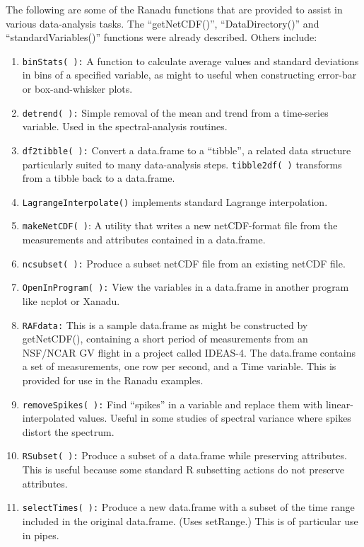 \documentclass[12pt,english]{report}\usepackage[]{graphicx}\usepackage[]{color}
\begin{document}
The following are some of the Ranadu functions that are provided to
assist in various data-analysis tasks. The ``getNetCDF()'', ``DataDirectory()''
and ``standardVariables()'' functions were already described. Others
include:
\begin{enumerate}
\item \texttt{binStats( ):} A function to calculate average values and standard
deviations in bins of a specified variable, as might to useful when
constructing error-bar or box-and-whisker plots.
\item \texttt{detrend( ):} Simple removal of the mean and trend from a time-series
variable. Used in the spectral-analysis routines.
\item \texttt{df2tibble( ):} Convert a data.frame to a ``tibble'', a related
data structure particularly suited to many data-analysis steps. \texttt{tibble2df(
)} transforms from a tibble back to a data.frame.
\item \texttt{LagrangeInterpolate()} implements standard Lagrange interpolation.
\item \texttt{makeNetCDF( )}: A utility that writes a new netCDF-format
file from the measurements and attributes contained in a data.frame.
\item \texttt{ncsubset( ):} Produce a subset netCDF file from an existing
netCDF file.
\item \texttt{OpenInProgram( ):} View the variables in a data.frame in another
program like ncplot or Xanadu.
\item \texttt{RAFdata:} This is a sample data.frame as might be constructed
by getNetCDF(), containing a short period of measurements from an
NSF/NCAR GV flight in a project called \textquotedbl IDEAS-4\textquotedbl .
The data.frame contains a set of measurements, one row per second,
and a \textquotedbl Time\textquotedbl{} variable. This is provided
for use in the Ranadu examples.
\item \texttt{removeSpikes( ):} Find ``spikes'' in a variable and replace
them with linear-interpolated values. Useful in some studies of spectral
variance where spikes distort the spectrum.
\item \texttt{RSubset( ):} Produce a subset of a data.frame while preserving
attributes. This is useful because some standard R subsetting actions
do not preserve attributes.
\item \texttt{selectTimes( ):} Produce a new data.frame with a subset of
the time range included in the original data.frame. (Uses setRange.)
This is of particular use in pipes.

\end{enumerate}
\end{document}
